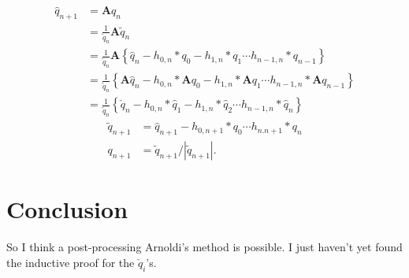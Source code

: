 \documentclass[12pt]{article}
\newcommand{\A}{\mathbf{A}}
\newcommand{\qh}[1]{\hat{q}_{#1}}
\newcommand{\qt}[1]{\tilde{q}_{#1}}
\newcommand{\qc}[1]{\check{q}_{#1}}
\newcommand{\Aq}[1]{\A q_{#1}}
\newcommand{\Ah}[1]{\A \qh{#1}}
\newcommand{\At}[1]{\A \qt{#1}}
\begin{document}
\begin{subequations}
    \begin{align}
        \qh{n+1} &= \Aq{n} \\
        &= \frac{1}{\qt{n}}\At{n} \\
        &= \frac{1}{\qt{n}}\A 
        \left\{\qh{n} - h_{0,n}*q_0 - h_{1,n}*q_1 \cdots h_{n-1,n}*q_{n-1}\right\} \\
        &= \frac{1}{\qt{n}}
        \left\{\Ah{n} - h_{0,n}*\Aq{0} - h_{1,n}*\Aq{1} \cdots h_{n-1,n}*\Aq{n-1}\right\} \\
        &= \frac{1}{\qt{n}}
        \left\{\qc{n} - h_{0,n}*\qh{1} - h_{1,n}*\qh{2} \cdots h_{n-1,n}*\qh{n}\right\}
    \end{align}
\end{subequations}
\begin{subequations}
    \begin{align}
        \qt{n+1} &= \qh{n+1} - h_{0,n+1}*q_0 \cdots h_{n.n+1}*q_n \\
        q_{n+1} &= \qt{n+1}/\left|\qt{n+1}\right|.
    \end{align}
\end{subequations}

\section{Conclusion}
So I think a post-processing Arnoldi's method is possible.  I just haven't yet found the inductive proof for the $\qc{i}$'s.
\end{document}
